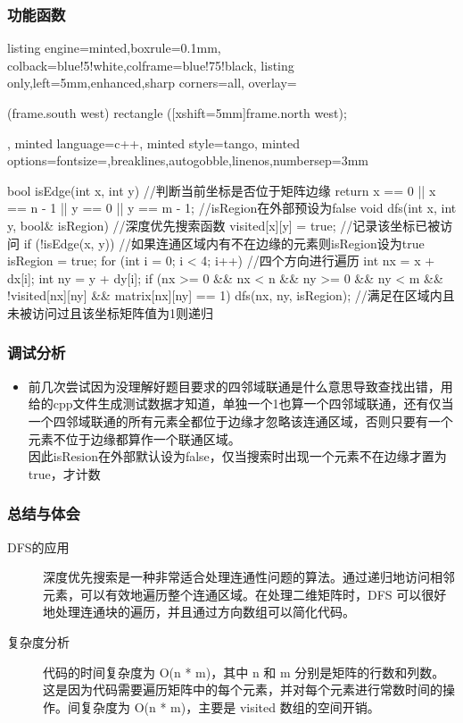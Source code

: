 \documentclass[12pt]{article}
\begin{document}
\subsubsection{功能函数}
{\songti }
\begin{tcblisting}{listing engine=minted,boxrule=0.1mm,
colback=blue!5!white,colframe=blue!75!black,
listing only,left=5mm,enhanced,sharp corners=all,
overlay={\begin{tcbclipinterior} (frame.south west)
rectangle ([xshift=5mm]frame.north west);\end{tcbclipinterior}},
minted language=c++,
minted style=tango,
minted options={fontsize=\small,breaklines,autogobble,linenos,numbersep=3mm}}
bool isEdge(int x, int y) {  //判断当前坐标是否位于矩阵边缘
    return x == 0 || x == n - 1 || y == 0 || y == m - 1;
}
//isRegion在外部预设为false
void dfs(int x, int y, bool& isRegion) { //深度优先搜索函数
    visited[x][y] = true; //记录该坐标已被访问
    if (!isEdge(x, y)) { //如果连通区域内有不在边缘的元素则isRegion设为true
        isRegion = true; 
    }
    for (int i = 0; i < 4; i++) { //四个方向进行遍历
        int nx = x + dx[i];
        int ny = y + dy[i];
        if (nx >= 0 && nx < n && ny >= 0 && ny < m && !visited[nx][ny] && matrix[nx][ny] == 1) { 
            dfs(nx, ny, isRegion); //满足在区域内且未被访问过且该坐标矩阵值为1则递归
        }
    }
}
\end{tcblisting}
\subsubsection{调试分析}
\begin{itemize}
    \item 前几次尝试因为没理解好题目要求的四邻域联通是什么意思导致查找出错，用给的cpp文件生成测试数据才知道，单独一个1也算一个四邻域联通，还有仅当一个四邻域联通的所有元素全都位于边缘才忽略该连通区域，否则只要有一个元素不位于边缘都算作一个联通区域。\\
    因此isResion在外部默认设为false，仅当搜索时出现一个元素不在边缘才置为true，才计数
\end{itemize}
\subsubsection{总结与体会}
\begin{description}
    \item[DFS的应用] 深度优先搜索是一种非常适合处理连通性问题的算法。通过递归地访问相邻元素，可以有效地遍历整个连通区域。在处理二维矩阵时，DFS 可以很好地处理连通块的遍历，并且通过方向数组可以简化代码。
    \item[复杂度分析] 代码的时间复杂度为 O(n * m)，其中 n 和 m 分别是矩阵的行数和列数。这是因为代码需要遍历矩阵中的每个元素，并对每个元素进行常数时间的操作。间复杂度为 O(n * m)，主要是 visited 数组的空间开销。
\end{description}
\end{document}
